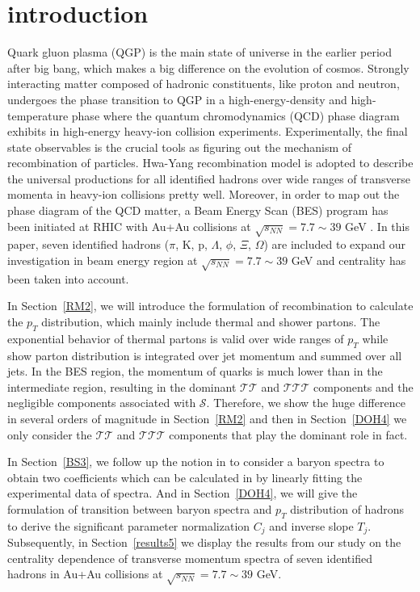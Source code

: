\documentclass[twocolumn,aps,superscriptaddress,showpacs,nofootinbib,floatfix]{revtex4}
\begin{document}
\section{introduction}
Quark gluon plasma (QGP) is the main state of universe in the earlier period after big bang, which makes a big difference on the evolution of cosmos. Strongly interacting matter composed of hadronic constituents, like proton and neutron, undergoes the phase transition to QGP in a high-energy-density and high-temperature phase where the quantum chromodynamics (QCD) phase diagram exhibits in high-energy heavy-ion collision experiments. Experimentally, the final state observables is the crucial tools as figuring out the mechanism of recombination of particles. Hwa-Yang recombination model is adopted to describe the universal productions for all identified hadrons over wide ranges of transverse momenta in heavy-ion collisions pretty well\cite{2u}. Moreover, in order to map out the phase diagram of the QCD matter, a Beam Energy Scan (BES) program has been initiated at RHIC with Au+Au collisions at $\sqrt{s_{NN}}=7.7\sim39$ GeV \cite{STAR:2015vvs}. In this paper, seven identified hadrons ($\pi$, K, p, $\Lambda$, $\phi$, $\Xi$, $\Omega$) are included to expand our investigation in beam energy region at $\sqrt{s_{NN}}=7.7\sim39$ GeV and centrality has been taken into account. 

In Section~\ref{RM2}, we will introduce the formulation of recombination to calculate the $p_T$ distribution, which mainly include thermal and shower partons. The exponential behavior of thermal partons is valid over wide ranges of $p_T$ while show parton distribution is integrated over jet momentum and summed over all jets. In the BES region, the momentum of quarks is much lower than in the intermediate region, resulting in the dominant $\mathcal T\mathcal T$ and $\mathcal T\mathcal T\mathcal T$ components and the negligible components associated with $\mathcal S$. Therefore, we show the huge difference in several orders of magnitude in Section~\ref{RM2} and then in Section~\ref{DOH4} we only consider the $\mathcal T\mathcal T$ and $\mathcal T\mathcal T\mathcal T$ components that play the dominant role in fact.

In Section~\ref{BS3}, we follow up the notion in \cite{4u} to consider a baryon spectra to obtain two coefficients which can be calculated in \cite{3c} by linearly fitting the experimental data of spectra. And in Section~\ref{DOH4}, we will give the formulation of transition between baryon spectra and $p_T$ distribution of hadrons to derive the significant parameter normalization $C_j$ and inverse slope $T_j$. Subsequently, in Section~\ref{results5} we display the results from our study on the centrality dependence of transverse momentum spectra of seven identified hadrons in Au+Au collisions at $\sqrt{s_{NN}}=7.7\sim39$ GeV.
\end{document}

